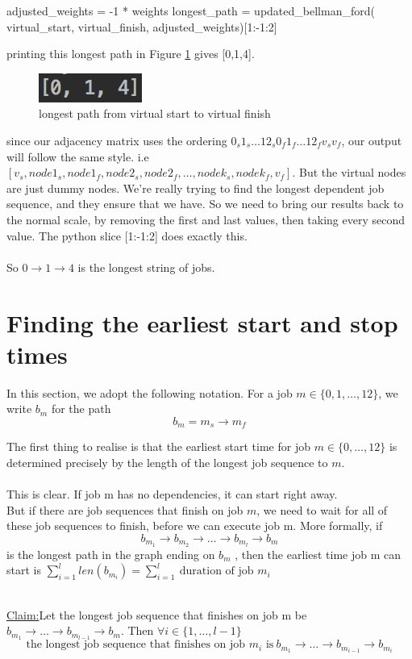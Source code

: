 \documentclass[paper=a4, fontsize=12pt]{scrartcl} %
\newenvironment{claim}[1]{\par\noindent\underline{Claim:}\space#1}{}
\numberwithin{equation}{section}       %
\numberwithin{figure}{section}         %
\numberwithin{table}{section}          %
\begin{document}
\begin{python}
    adjusted_weights = -1 * weights
    longest_path = updated_bellman_ford(
        virtual_start, virtual_finish, adjusted_weights)[1:-1:2]
\end{python}
printing this longest path in Figure \ref{long} gives [0,1,4].
\begin{figure}[h]\label{long}
\caption{longest path from virtual start to virtual finish}
\centering
\includegraphics[scale=0.9]{long}
\end{figure}

\bcattention \quad since our adjacency matrix uses the ordering $0_{s} 1_{s} \dots 12_{s} 0_{f} 1_{f} \dots 12_{f} v_{s} v_{f}$, our output will follow the same style. i.e $[v_{s},node1_{s},node1_{f},node2_{s},node2_{f},\dots,nodek_{s},nodek_{f},v_{f}]$. But the virtual nodes are just dummy nodes. We're really trying to find the longest dependent job sequence, and they ensure that we have. So we need to bring our results back to the normal scale, by removing the first and last values, then taking every second value. The python slice [1:-1:2] does exactly this. \\ \\

So $0 \to 1 \to 4$ is the longest string of jobs.

\section{Finding the earliest start and stop times}
In this section, we adopt the following notation. For a job $m \in \{0,1,\dots,12 \}$, we write $b_{m}$ for the path 
$$ b_{m} = m_{s} \to m_{f} $$

The first thing to realise is that the earliest start time for job $m \in \{ 0, \dots, 12 \}$ is determined precisely by the length of the longest job sequence to $m$. \\ \\
This is clear. If job m has no dependencies, it can start right away. \\ 
But if there are job sequences that finish on job $m$, we need to wait for all of these job sequences to finish, before we can execute job m. More formally, if $$ b_{m_{1}} \to b_{m_{2}} \to \dots \to b_{m_{l}} \to b_{m}$$
is the longest path in the graph ending on $b_{m}$ , then the earliest time job m can start is $\sum_{i=1}^{l}len(b_{m_{i}}) = \sum_{i=1}^{l} \ \text{duration of job $m_{i}$}$ \\ \\
\begin{claim}
Let the longest job sequence that finishes on job m be $b_{m_{1}} \to \dots \to b_{m_{l-1}} \to b_{m}$. Then $\forall i \in \{ 1,\dots,l-1\}$ $$\text{the longest job sequence that finishes on job $m_{i}$ is} \ b_{m_{1}} \to \dots \to b_{m_{i-1}} \to b_{m_{i}}$$
\end{claim}
\end{document}
